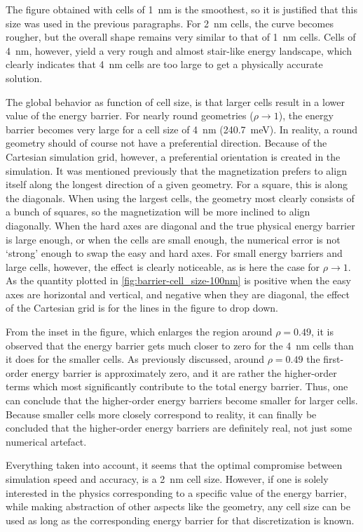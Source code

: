 \documentclass[11pt,a4paper,english]{article}
\begin{document}
The figure obtained with cells of \SI{1}{\nano\metre} is the smoothest, so it is justified that this size was used in the previous paragraphs. For \SI{2}{\nano\metre} cells, the curve becomes rougher, but the overall shape remains very similar to that of \SI{1}{\nano\metre} cells. Cells of \SI{4}{\nano\metre}, however, yield a very rough and almost stair-like energy landscape, which clearly indicates that \SI{4}{\nano\metre} cells are too large to get a physically accurate solution. \par
The global behavior as function of cell size, is that larger cells result in a lower value of the energy barrier. For nearly round geometries ($\rho \rightarrow 1$), the energy barrier becomes very large for a cell size of \SI{4}{\nano\metre} (\SI{240.7}{\milli\electronvolt}). In reality, a round geometry should of course not have a preferential direction. Because of the Cartesian simulation grid, however, a preferential orientation is created in the simulation. It was mentioned previously that the magnetization prefers to align itself along the longest direction of a given geometry. For a square, this is along the diagonals. When using the largest cells, the geometry most clearly consists of a bunch of squares, so the magnetization will be more inclined to align diagonally. When the hard axes are diagonal and the true physical energy barrier is large enough, or when the cells are small enough, the numerical error is not `strong' enough to swap the easy and hard axes. For small energy barriers and large cells, however, the effect is clearly noticeable, as is here the case for $\rho \rightarrow 1$. As the quantity plotted in \cref{fig:barrier-cell_size-100nm} is positive when the easy axes are horizontal and vertical, and negative when they are diagonal, the effect of the Cartesian grid is for the lines in the figure to drop down. \par
From the inset in the figure, which enlarges the region around $\rho=0.49$, it is observed that the energy barrier gets much closer to zero for the \SI{4}{\nano\metre} cells than it does for the smaller cells. As previously discussed, around $\rho=0.49$ the first-order energy barrier is approximately zero, and it are rather the higher-order terms which most significantly contribute to the total energy barrier. Thus, one can conclude that the higher-order energy barriers become smaller for larger cells. Because smaller cells more closely correspond to reality, it can finally be concluded that the higher-order energy barriers are definitely real, not just some numerical artefact. \par
Everything taken into account, it seems that the optimal compromise between simulation speed and accuracy, is a \SI{2}{\nano\metre} cell size. However, if one is solely interested in the physics corresponding to a specific value of the energy barrier, while making abstraction of other aspects like the geometry, any cell size can be used as long as the corresponding energy barrier for that discretization is known.
\end{document}
